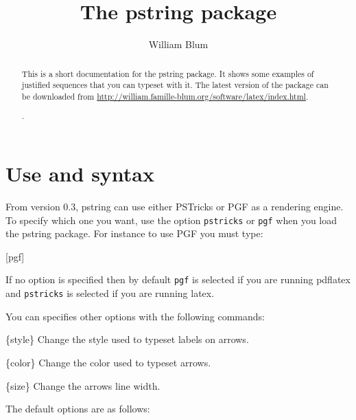 
%


\author{William Blum}
\title{The pstring package}

\maketitle
\begin{abstract}
This is a short documentation for the pstring package. It shows some examples of justified sequences that you can typeset with it.
The latest version of the package can be downloaded from \url{http://william.famille-blum.org/software/latex/index.html}.

\begin{codeexample}[width=5cm]
.
\end{codeexample}
\end{abstract}

\section{Use and syntax}

From version 0.3, pstring can use either PSTricks or PGF as a rendering engine. To specify which one
you want, use the option \verb|pstricks| or \verb|pgf| when you load the pstring package. For instance to use PGF you must type:
\begin{codeexample}
\usepackage{pstring}[pgf]
\end{codeexample}
If no option is specified then by default \verb|pgf| is selected if you are running pdflatex
and \verb|pstricks| is selected if you are running latex.

You can specifies other options with the following commands:
\begin{command}{\pstrSetLabelStyle\{style\}}
Change the style used to typeset labels on arrows.
\end{command}
\begin{command}{\pstrSetArrowColor\{color\}}
Change the color used to typeset arrows.
\end{command}
\begin{command}{\pstrSetArrowLineWidth\{size\}}
Change the arrows line width.
\end{command}
The default options are as follows:
\begin{codeexample}
\pstrSetLabelStyle{\color{blue} \tiny}
\pstrSetArrowLineWidth{0.3pt}
\end{codeexample}

